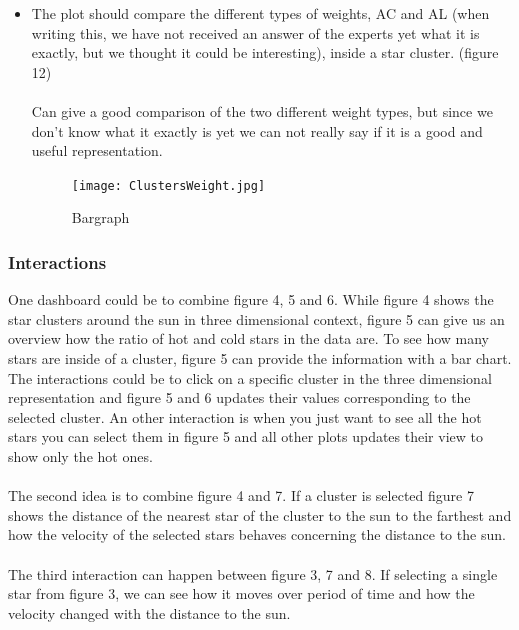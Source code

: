 \documentclass{article}
\begin{document}
\begin{itemize}
\newpage\item The plot should compare the different types of weights, AC and AL (when writing this, we have not received an answer of the experts yet what it is exactly, but we thought it could be interesting), inside a star cluster. (figure 12)\\
\\
Can give a good comparison of the two different weight types, but since we don't know what it exactly is yet we can not really say if it is a good and useful representation.
\begin{figure}[!h]
\centering
\texttt{[image: ClustersWeight.jpg]}
	\caption{Bargraph  }
	\label{fig12}
\end{figure}
\end{itemize}
\newpage\subsubsection{Interactions}
One dashboard could be to combine figure 4, 5 and 6. While figure 4 shows the star clusters around the sun in three dimensional context, figure 5 can give us an overview how the ratio of hot and cold stars in the data are. To see how many stars are inside of a cluster, figure 5 can provide the information with a bar chart. The interactions could be to click on a specific cluster in the three dimensional representation and figure 5 and 6 updates their values corresponding to the selected cluster. An other interaction is when you just want to see all the hot stars you can select them in figure 5 and all other plots updates their view to show only the hot ones.\\
\\
The second idea is to combine figure 4 and 7. If a cluster is selected figure 7 shows the distance of the nearest star of the cluster to the sun to the farthest and how the velocity of the selected stars behaves concerning the distance to the sun.\\
\\
The third interaction can happen between figure 3, 7 and 8. If selecting a single star from figure 3, we can see how it moves over period of time and how the velocity changed with the distance to the sun.
\end{document}
